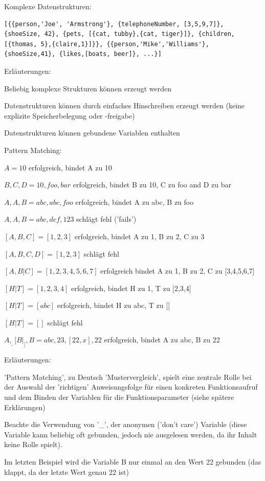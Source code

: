 \documentclass[10pt]{article}
\begin{document}
Komplexe Datenstrukturen:
\begin{lstlisting}
[{{person,'Joe', 'Armstrong'}, {telephoneNumber, [3,5,9,7]}, {shoeSize, 42}, {pets, [{cat, tubby},{cat, tiger}]}, {children,[{thomas, 5},{claire,1}]}}, {{person,'Mike','Williams'}, {shoeSize,41}, {likes,[boats, beer]}, ...}]
\end{lstlisting}
\begin{itemize*}
  \item Erläuterungen:
  \begin{itemize*}
    \item Beliebig komplexe Strukturen können erzeugt werden
    \item Datenstrukturen können durch einfaches Hinschreiben erzeugt werden (keine explizite Speicherbelegung oder -freigabe)
    \item Datenstrukturen können gebundene Variablen enthalten
  \end{itemize*}
\end{itemize*}

Pattern Matching:
\begin{itemize*}
  \item $A = 10$ erfolgreich, bindet A zu 10
  \item ${B, C, D} = {10, foo, bar}$ erfolgreich, bindet B zu 10, C zu foo and D zu bar
  \item ${A, A, B} = {abc, abc, foo}$ erfolgreich, bindet A zu abc, B zu foo
  \item ${A, A, B} = {abc, def, 123}$ schlägt fehl ('fails')
  \item $[A,B,C] = [1,2,3]$ erfolgreich, bindet A zu 1, B zu 2, C zu 3
  \item $[A,B,C,D] = [1,2,3]$ schlägt fehl
  \item $[A,B|C] = [1,2,3,4,5,6,7]$ erfolgreich bindet A zu 1, B zu 2, C zu [3,4,5,6,7]
  \item $[H|T] = [1,2,3,4]$ erfolgreich, bindet H zu 1, T zu [2,3,4]
  \item $[H|T] = [abc]$ erfolgreich, bindet H zu abc, T zu []
  \item $[H|T] = []$ schlägt fehl
  \item ${A,_, [B|_],{B}} = {abc,23,[22,x],{22}}$ erfolgreich, bindet A zu abc, B zu 22
  \item Erläuterungen:
  \begin{itemize*}
    \item 'Pattern Matching', zu Deutsch 'Mustervergleich', spielt eine zentrale Rolle bei der Auswahl der 'richtigen' Anweisungsfolge für einen konkreten Funktionsaufruf und dem Binden der Variablen für die Funktionsparameter (siehe spätere Erklärungen)
    \item Beachte die Verwendung von '\_', der anonymen ('don't care') Variable (diese Variable kann beliebig oft gebunden, jedoch nie ausgelesen werden, da ihr Inhalt keine Rolle spielt).
    \item Im letzten Beispiel wird die Variable B nur einmal an den Wert 22 gebunden (das klappt, da der letzte Wert genau {22} ist)
  \end{itemize*}
\end{itemize*}
\end{document}
